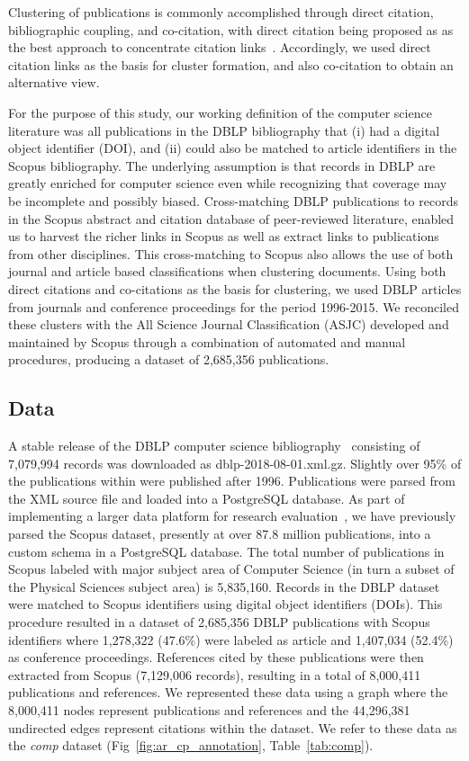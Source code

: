  Clustering of publications is commonly accomplished through direct citation, bibliographic coupling, and co-citation, with direct citation being proposed as as the best approach to concentrate citation links~\cite{klavans_which_2017}. Accordingly, we used direct citation links as the basis for cluster formation, and also co-citation to obtain an alternative view.

For the purpose of this study, our working definition of the computer science literature was all publications in the DBLP bibliography that (i) had a digital object identifier (DOI), and (ii) could also be matched to article identifiers in the Scopus bibliography. The underlying assumption is that records in DBLP are greatly enriched for computer science even while recognizing that coverage may be incomplete and possibly biased. Cross-matching DBLP publications to records in the Scopus abstract and citation database of peer-reviewed literature, enabled us to harvest the richer links in Scopus as well as extract links to publications from other disciplines. This cross-matching to Scopus also allows the use of both journal and article based classifications when clustering documents. Using both direct citations and co-citations as the basis for clustering, we used DBLP articles from journals and conference proceedings for the period 1996-2015. We reconciled these clusters with the All Science Journal Classification (ASJC) developed and maintained by Scopus through a combination of automated and manual procedures, producing a dataset of  2,685,356 publications.

\subsection{Data}
A stable release of the DBLP computer science bibliography~\cite{dblp_ref} consisting of 7,079,994 records was downloaded as dblp-2018-08-01.xml.gz. Slightly over 95\% of the publications within were published after 1996. Publications were parsed from the XML source file and loaded into a PostgreSQL database. As part of implementing a larger data platform for research evaluation~\cite{GithubERNIE2019}, we have previously parsed the Scopus dataset, presently at over 87.8 million publications, into a custom schema in a PostgreSQL database. The total number of publications in Scopus labeled with major subject area of Computer Science (in turn a subset of the Physical Sciences subject area) is 5,835,160. Records in the DBLP dataset were matched to Scopus identifiers using digital object identifiers (DOIs). This procedure resulted in a dataset of 2,685,356 DBLP publications with Scopus identifiers where 1,278,322 (47.6\%) were labeled as article and 1,407,034 (52.4\%) as conference proceedings.  References cited by these publications were then extracted from Scopus (7,129,006 records), resulting in a total of 8,000,411 
publications and references. 
We represented these data using a graph where the 8,000,411 nodes represent
publications and references  and the 44,296,381 undirected edges represent citations within the dataset. 
We refer to these data as the  \emph{comp} dataset (Fig~\ref{fig:ar_cp_annotation}, Table~\ref{tab:comp}).  
 
